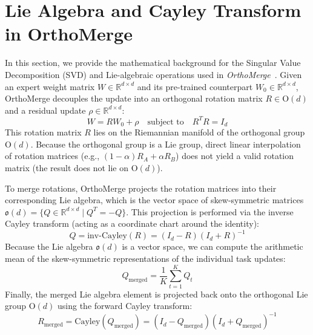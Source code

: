 \documentclass{article}
\begin{document}
\nocite{*}



\newpage
\appendix
\onecolumn
\section{Lie Algebra and Cayley Transform in OrthoMerge}
\label{app:lie_algebra}

In this section, we provide the mathematical background for the Singular Value Decomposition (SVD) and Lie-algebraic operations used in \textit{OrthoMerge}~\cite{orthomerge2024}. Given an expert weight matrix $W \in \mathbb{R}^{d \times d}$ and its pre-trained counterpart $W_0 \in \mathbb{R}^{d \times d}$, OrthoMerge decouples the update into an orthogonal rotation matrix $R \in \text{O}(d)$ and a residual update $\rho \in \mathbb{R}^{d \times d}$:
\begin{equation}
    W = R W_0 + \rho \quad \text{subject to} \quad R^T R = I_d
\end{equation}
This rotation matrix $R$ lies on the Riemannian manifold of the orthogonal group $\text{O}(d)$. Because the orthogonal group is a Lie group, direct linear interpolation of rotation matrices (e.g., $(1-\alpha)R_A + \alpha R_B$) does not yield a valid rotation matrix (the result does not lie on $\text{O}(d)$). 

To merge rotations, OrthoMerge projects the rotation matrices into their corresponding Lie algebra, which is the vector space of skew-symmetric matrices $\mathfrak{o}(d) = \{ Q \in \mathbb{R}^{d \times d} \mid Q^T = -Q \}$. This projection is performed via the inverse Cayley transform (acting as a coordinate chart around the identity):
\begin{equation}
    Q = \text{inv-Cayley}(R) = (I_d - R)(I_d + R)^{-1}
\end{equation}
Because the Lie algebra $\mathfrak{o}(d)$ is a vector space, we can compute the arithmetic mean of the skew-symmetric representations of the individual task updates:
\begin{equation}
    Q_{\text{merged}} = \frac{1}{K} \sum_{t=1}^K Q_t
\end{equation}
Finally, the merged Lie algebra element is projected back onto the orthogonal Lie group $\text{O}(d)$ using the forward Cayley transform:
\begin{equation}
    R_{\text{merged}} = \text{Cayley}(Q_{\text{merged}}) = (I_d - Q_{\text{merged}})(I_d + Q_{\text{merged}})^{-1}
\end{equation}
\end{document}
